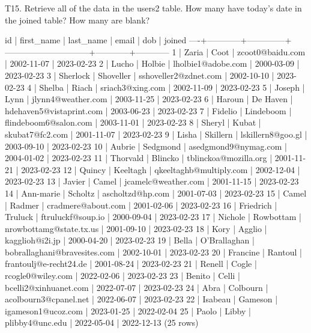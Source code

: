 T15. Retrieve all of the data in the users2 table. How many have today’s date in the joined table? How many are blank?
\begin{pseudo}
 id | first_name |  last_name   |            email             |    dob     |   joined
----+------------+--------------+------------------------------+------------+------------
  1 | Zaria      | Coot         | zcoot0@baidu.com             | 2002-11-07 | 2023-02-23
  2 | Lucho      | Holbie       | lholbie1@adobe.com           | 2000-03-09 | 2023-02-23
  3 | Sherlock   | Shoveller    | sshoveller2@zdnet.com        | 2002-10-10 | 2023-02-23
  4 | Shelba     | Riach        | sriach3@xing.com             | 2002-11-09 | 2023-02-23
  5 | Joseph     | Lynn         | jlynn4@weather.com           | 2003-11-25 | 2023-02-23
  6 | Haroun     | De Haven     | hdehaven5@vistaprint.com     | 2003-06-23 | 2023-02-23
  7 | Fidelio    | Lindeboom    | flindeboom6@salon.com        | 2003-11-01 | 2023-02-23
  8 | Sheryl     | Kubat        | skubat7@fc2.com              | 2001-11-07 | 2023-02-23
  9 | Lisha      | Skillern     | lskillern8@goo.gl            | 2003-09-10 | 2023-02-23
 10 | Aubrie     | Sedgmond     | asedgmond9@nymag.com         | 2004-01-02 | 2023-02-23
 11 | Thorvald   | Blincko      | tblinckoa@mozilla.org        | 2001-11-21 | 2023-02-23
 12 | Quincy     | Keeltagh     | qkeeltaghb@multiply.com      | 2002-12-04 | 2023-02-23
 13 | Javier     | Camel        | jcamelc@weather.com          | 2001-11-15 | 2023-02-23
 14 | Ann-marie  | Scholtz      | ascholtzd@hp.com             | 2001-07-03 | 2023-02-23
 15 | Camel      | Radmer       | cradmere@about.com           | 2001-02-06 | 2023-02-23
 16 | Friedrich  | Truluck      | ftruluckf@soup.io            | 2000-09-04 | 2023-02-23
 17 | Nichole    | Rowbottam    | nrowbottamg@state.tx.us      | 2001-09-10 | 2023-02-23
 18 | Kory       | Agglio       | kagglioh@i2i.jp              | 2000-04-20 | 2023-02-23
 19 | Bella      | O'Brallaghan | bobrallaghani@bravesites.com | 2002-10-01 | 2023-02-23
 20 | Francine   | Rantoul      | frantoulj@e-recht24.de       | 2001-08-24 | 2023-02-23
 21 | Renell     | Cogle        | rcogle0@wiley.com            | 2022-02-06 | 2023-02-23
 23 | Benito     | Celli        | bcelli2@xinhuanet.com        | 2022-07-07 | 2023-02-23
 24 | Abra       | Colbourn     | acolbourn3@cpanel.net        | 2022-06-07 | 2023-02-23
 22 | Isabeau    | Gameson      | igameson1@ucoz.com           | 2023-01-25 | 2022-02-04
 25 | Paolo      | Libby        | plibby4@unc.edu              | 2022-05-04 | 2022-12-13
(25 rows)
\end{pseudo}

